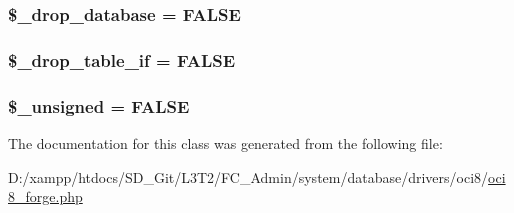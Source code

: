 \subsubsection[{\$\+\_\+drop\+\_\+database}]{\setlength{\rightskip}{0pt plus 5cm}\$\+\_\+drop\+\_\+database = F\+A\+L\+S\+E\hspace{0.3cm}{\ttfamily [protected]}}\label{class_c_i___d_b__oci8__forge_a8305b12fc17f6f87778260ebdff287b4}
\hypertarget{class_c_i___d_b__oci8__forge_a92a8a9145a7fc91e252e58d019373581}{}
\subsubsection[{\$\+\_\+drop\+\_\+table\+\_\+if}]{\setlength{\rightskip}{0pt plus 5cm}\$\+\_\+drop\+\_\+table\+\_\+if = F\+A\+L\+S\+E\hspace{0.3cm}{\ttfamily [protected]}}\label{class_c_i___d_b__oci8__forge_a92a8a9145a7fc91e252e58d019373581}
\hypertarget{class_c_i___d_b__oci8__forge_aae977ae6d61fa183f0b25422b6ddc31c}{}
\subsubsection[{\$\+\_\+unsigned}]{\setlength{\rightskip}{0pt plus 5cm}\$\+\_\+unsigned = F\+A\+L\+S\+E\hspace{0.3cm}{\ttfamily [protected]}}\label{class_c_i___d_b__oci8__forge_aae977ae6d61fa183f0b25422b6ddc31c}


The documentation for this class was generated from the following file\+:\begin{DoxyCompactItemize}
\item 
D\+:/xampp/htdocs/\+S\+D\+\_\+\+Git/\+L3\+T2/\+F\+C\+\_\+\+Admin/system/database/drivers/oci8/\hyperlink{oci8__forge_8php}{oci8\+\_\+forge.\+php}\end{DoxyCompactItemize}
